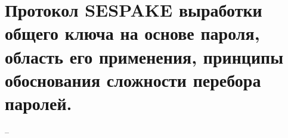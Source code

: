 \section{Протокол SESPAKE выработки общего ключа на основе пароля, область его применения, принципы обоснования сложности перебора паролей.}

--